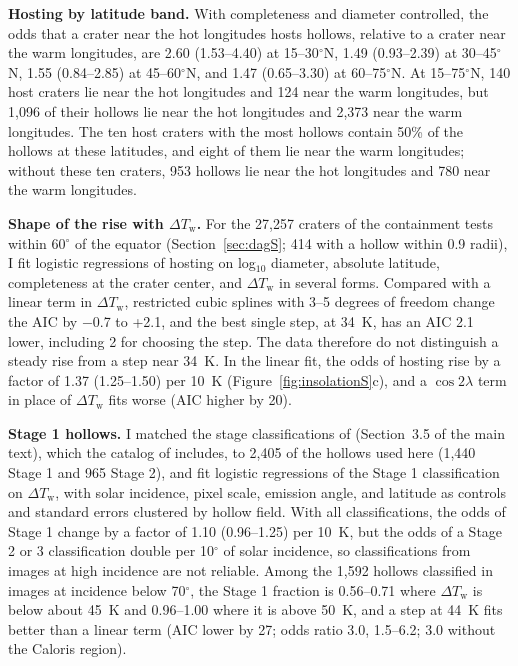 \documentclass{planetary}
\begin{document}
\textbf{Hosting by latitude band.} With completeness and diameter controlled, the odds that a crater near the hot longitudes hosts hollows, relative to a crater near the warm longitudes, are 2.60 (1.53--4.40) at 15--30$^\circ$N, 1.49 (0.93--2.39) at 30--45$^\circ$N, 1.55 (0.84--2.85) at 45--60$^\circ$N, and 1.47 (0.65--3.30) at 60--75$^\circ$N. At 15--75$^\circ$N, 140 host craters lie near the hot longitudes and 124 near the warm longitudes, but 1,096 of their hollows lie near the hot longitudes and 2,373 near the warm longitudes. The ten host craters with the most hollows contain 50\% of the hollows at these latitudes, and eight of them lie near the warm longitudes; without these ten craters, 953 hollows lie near the hot longitudes and 780 near the warm longitudes.

\textbf{Shape of the rise with $\Delta T_\mathrm{w}$.} For the 27,257 craters of the containment tests within 60$^\circ$ of the equator (Section~\ref{sec:dagS}; 414 with a hollow within 0.9 radii), I fit logistic regressions of hosting on log$_{10}$ diameter, absolute latitude, completeness at the crater center, and $\Delta T_\mathrm{w}$ in several forms. Compared with a linear term in $\Delta T_\mathrm{w}$, restricted cubic splines with 3--5 degrees of freedom change the AIC by $-$0.7 to +2.1, and the best single step, at 34~K, has an AIC 2.1 lower, including 2 for choosing the step. The data therefore do not distinguish a steady rise from a step near 34~K. In the linear fit, the odds of hosting rise by a factor of 1.37 (1.25--1.50) per 10~K (Figure~\ref{fig:insolationS}c), and a $\cos 2\lambda$ term in place of $\Delta T_\mathrm{w}$ fits worse (AIC higher by 20).

\textbf{Stage 1 hollows.} I matched the stage classifications of \textcite{deutsch2025} (Section~3.5 of the main text), which the catalog of \textcite{bickel2025} includes, to 2,405 of the hollows used here (1,440 Stage 1 and 965 Stage 2), and fit logistic regressions of the Stage 1 classification on $\Delta T_\mathrm{w}$, with solar incidence, pixel scale, emission angle, and latitude as controls and standard errors clustered by hollow field. With all classifications, the odds of Stage 1 change by a factor of 1.10 (0.96--1.25) per 10~K, but the odds of a Stage 2 or 3 classification double per 10$^\circ$ of solar incidence, so classifications from images at high incidence are not reliable. Among the 1,592 hollows classified in images at incidence below 70$^\circ$, the Stage 1 fraction is 0.56--0.71 where $\Delta T_\mathrm{w}$ is below about 45~K and 0.96--1.00 where it is above 50~K, and a step at 44~K fits better than a linear term (AIC lower by 27; odds ratio 3.0, 1.5--6.2; 3.0 without the Caloris region).
\end{document}
